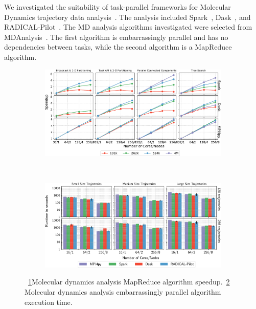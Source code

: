 We investigated the suitability of task-parallel frameworks for Molecular Dynamics trajectory data analysis~\cite{paraskevakos2018task}. 
The analysis included Spark~\cite{zaharia2010spark}, Dask~\cite{rocklin2015dask}, and RADICAL-Pilot~\cite{merzky2019using}. 
The MD analysis algorithms investigated were selected from MDAnalysis~\cite{gowers2016mdanalysis,michaud2011mdanalysis}. 
The first algorithm is embarrassingly parallel and has no dependencies between tasks, while the second algorithm is a MapReduce algorithm.

\begin{figure}[t]
    \centering
    \begin{subfigure}[b]{0.45\textwidth}
        \includegraphics[width=.95\textwidth]{figures/All4approachesWith4MSpeedup.pdf}
        \caption{}
        \label{fig:leafletfinder}
    \end{subfigure}%
    ~ 
    \begin{subfigure}[b]{0.45\textwidth}
        \includegraphics[width=\linewidth]{figures/HausdorffSingleFig.pdf}
        \caption{}
        \label{fig:hausdorff}
    \end{subfigure}
    \caption{~\ref{fig:leafletfinder}Molecular dynamics analysis MapReduce algorithm speedup.~\ref{fig:hausdorff} Molecular dynamics analysis embarrassingly parallel algorithm execution time.}\label{fig:md_analysis}
\end{figure}

